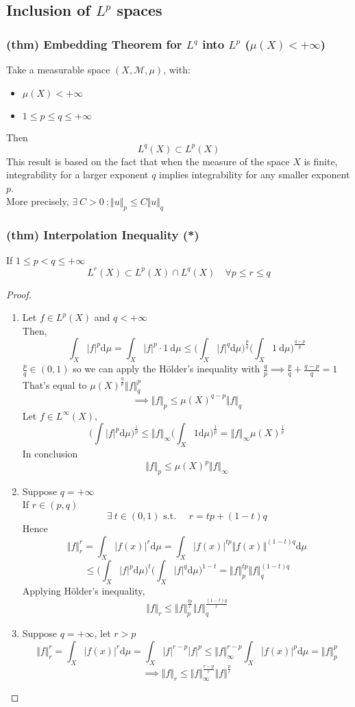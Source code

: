 \subsection{Inclusion of $L^p$ spaces}
\subsubsection{(thm) Embedding Theorem for $L^q$ into $L^p$ ($\mu(X)<+\infty$)}
Take a measurable space $(X,\mathcal M,\mu)$, with:
\begin{itemize}
    \item $\mu(X)<+\infty$
    \item $1\leq p\leq q\leq +\infty$
\end{itemize}
Then $$L^q(X)\subset L^p(X)$$
This result is based on the fact that when the measure of the space $X$ is finite, integrability for a larger exponent $q$ implies integrability for any smaller exponent $p$. \\
More precisely, $\exists\ C>0 \ : \Vert u\Vert_p \leq C\Vert u\Vert_q$
\subsubsection{(thm) Interpolation Inequality (*)}
If $1\leq p<q\leq +\infty$
$$L^r(X)\subset L^p(X)\cap L^q(X)\quad \forall p\leq r\leq q$$
\begin{proof}\ 
\begin{enumerate}
    \item Let $f\in L^p(X)$ and $q<+\infty$\\
Then, $$\int_X |f|^p\mathrm d\mu=\int_X |f|^p\cdot 1\ \mathrm d\mu \leq \Big (\int_X |f|^q\mathrm d\mu\Big )^{\frac pq}\Big (\int_X 1\ \mathrm d\mu\Big)^{\frac{q-p}{p}}$$
$\frac pq\in (0,1)$ so we can apply the Hölder's inequality with $\frac qp\implies \frac pq + \frac{q-p}{q}=1$\\
That's equal to $\mu(X)^{\frac qp}\Vert f\Vert_q^p$
$$\implies \Vert f\Vert_p\leq \mu(X)^{q-p}\Vert f\Vert_q$$
Let $f\in L^\infty(X)$,
$$\Big ( \int |f|^p\mathrm d\mu\Big )^{\frac{1}{p}}\leq \Vert f\Vert_\infty \Big (\int_X1\mathrm d\mu\Big)^{\frac 1p}=\Vert f\Vert_\infty \mu(X)^{\frac 1p}$$
In conclusion 
$$\Vert f\Vert_p\leq \mu(X)^p\Vert f\Vert_\infty$$
\item Suppose $q = +\infty$\\
If $r\in (p,q) $
$$\exists \ t\in (0,1)\text{ s.t. }\quad r=tp+(1-t)q $$
Hence
$$\Vert f\Vert_r^r =\int_X|f(x)|^r\mathrm d\mu =\int_X|f(x)|^{tp}\Vert f(x)\Vert^{(1-t)q}\mathrm d\mu$$
$$\leq \Big (\int_X|f|^p\mathrm d \mu\Big )^t\Big (\int_X |f|^q\mathrm d\mu\Big )^{1-t}=\Vert f\Vert_p^{tp}\Vert f\Vert_q^{(1-t)q}$$
Applying Hölder's inequality,
$$\Vert f\Vert_r\leq \Vert f\Vert_p^{\frac{tp}{r}}\Vert f\Vert_q^{\frac{(1-t)q}{r}}$$
\item Suppose $q=+\infty$, let $r>p$
$$\Vert f\Vert_r^r =\int_X|f(x)|^r\mathrm d\mu =\int_X |f|^{r-p}|f|^p\leq \Vert f\Vert_\infty^{r-p}\int_X|f(x)|^p\mathrm d\mu=\Vert f\Vert_p^p$$
$$\implies \Vert f\Vert_r\leq \Vert f\Vert_\infty^{\frac{r-p}{r}}\Vert f\Vert^{\frac pr}$$

\end{enumerate}


\end{proof}
